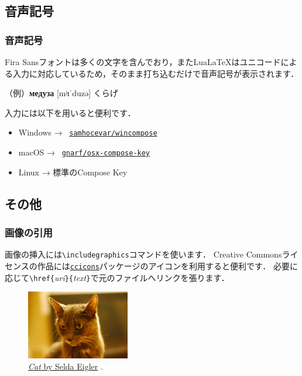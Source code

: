 \documentclass[
    12pt,
    unicode]{beamer}
\begin{document}
\subsection{音声記号}
\begin{frame}
    \frametitle{音声記号}
    Fira Sansフォントは多くの文字を含んでおり，またLua\LaTeX はユニコードによる入力に対応しているため，そのまま打ち込むだけで音声記号が表示されます．

    \smallskip

    （例）\textbf{медуза} [mʲɪˈduzə] くらげ

    \bigskip

    入力には以下を用いると便利です．
    \begin{itemize}
        \item Windows → \faGithub\ \href{https://github.com/samhocevar/wincompose}{\texttt{samhocevar/wincompose}}
        \item macOS → \faGithub\ \href{https://github.com/gnarf/osx-compose-key}{\texttt{gnarf/osx-compose-key}}
        \item Linux → 標準のCompose Key
    \end{itemize}
\end{frame}

\subsection{その他}
\begin{frame}[fragile]
    \frametitle{画像の引用}
    画像の挿入には\verb+\includegraphics+コマンドを使います．
    Creative Commonsライセンスの作品には\href{https://ctan.org/pkg/ccicons}{\texttt{ccicons}}パッケージのアイコンを利用すると便利です．
    必要に応じて\verb+\href{+\emph{uri}\verb+}{+\emph{text}\verb+}+で元のファイルへリンクを張ります．

    \bigskip

    \begin{figure}[b]
        \includegraphics[width=0.4\textwidth]{cat.jpg}
        \caption{\href{https://www.flickr.com/photos/selda_eigler/8687127864/in/photolist-eeDNsC-qWFs4R-7CNDjJ-9c8DxY-eeDNhC-UCZ63T-dJNGUc-e5Nk39-988EVA-kUgwo-owDcVP-jQGjjt-5zkGTy-7WRCUo-b91XbZ-Mj8Ku-5pzwSA-9Bct2H-7CNHMY-7CJJMB-8MyEYn-9x45Mp-7JTq8M-ZrpGJ9-8fRht4-4SxVZT-5pzwjJ-ZsPJjL-aE44GL-dF6uWD-kqbHgM-5F373J-ZsQrVG-qyD7E9-ajyDPL-4WDvTp-KbDSc-5kCxD9-4MdeUo-pgDQcG-pPWrXD-662AFD-oTnC8k-apYceQ-nJSaaY-7CJLZv-7CJJMn-7CNFsU-XNMWkw-ccdtT9}{\emph{Cat} by Selda Eigler} \ccby.}
    \end{figure}

\end{frame}
\end{document}
